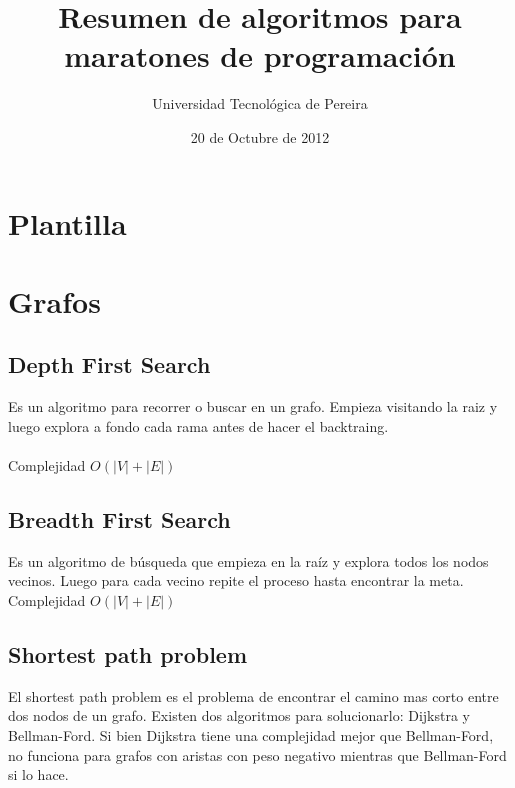 \documentclass[10pt,letterpaper,twocolumn,twosided]{article}
\date{20 de Octubre de 2012}
\newcommand{\codigofuente}[1]{

\dotfill
}
\begin{document}
\title{Resumen de algoritmos para maratones de programación}
\author{Universidad Tecnológica de Pereira}
\maketitle

\tableofcontents
{}

\section{Plantilla}

\codigofuente{src/template.cpp}

\section{Grafos}

\subsection{Depth First Search}

Es un algoritmo para recorrer o buscar en un grafo. Empieza visitando la raiz y luego explora 
a fondo cada rama antes de hacer el backtraing.\\
\\
Complejidad $O(|V|+|E|)$

\codigofuente{src/graphs/dfs.cpp}

\subsection{Breadth First Search}

Es un algoritmo de búsqueda que empieza en la raíz y explora todos los nodos vecinos. Luego para cada
vecino repite el proceso hasta encontrar la meta.\\
Complejidad $O(|V|+|E|)$

\codigofuente{src/graphs/bfs.cpp}

\subsection{Shortest path problem}

El shortest path problem es el problema de encontrar el camino mas corto entre dos nodos de un grafo. Existen
dos algoritmos para solucionarlo: Dijkstra y Bellman-Ford. Si bien Dijkstra tiene una complejidad mejor que
Bellman-Ford, no funciona para grafos con aristas con peso negativo mientras que Bellman-Ford si lo hace.
\end{document}
